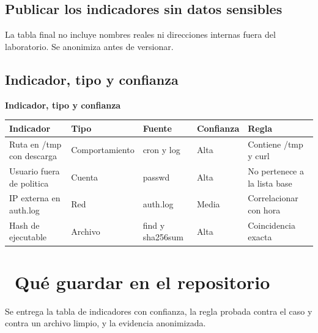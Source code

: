 \documentclass[11pt,a4paper]{article}
\newcommand{\iconotexto}[2]{\textcolor{cyanNeon}{\faIcon{#1}}~#2}
\begin{document}
\subsection{Publicar los indicadores sin datos sensibles}

La tabla final no incluye nombres reales ni direcciones internas fuera del laboratorio. Se anonimiza antes de versionar.

\subsection{Indicador, tipo y confianza}

\begin{center}
\begin{minipage}{\linewidth}
\centering
{\footnotesize
\textbf{Indicador, tipo y confianza}\par\smallskip
\begin{tabular}{@{}>{\raggedright\arraybackslash}p{3.00cm}>{\raggedright\arraybackslash}p{2.60cm}>{\raggedright\arraybackslash}p{2.40cm}>{\raggedright\arraybackslash}p{2.10cm}>{\raggedright\arraybackslash}p{2.70cm}@{}}
\toprule
\textbf{Indicador} & \textbf{Tipo} & \textbf{Fuente} & \textbf{Confianza} & \textbf{Regla} \\
\midrule
Ruta en /tmp con descarga & Comportamiento & cron y log & Alta & Contiene /tmp y curl \\
Usuario fuera de politica & Cuenta & passwd & Alta & No pertenece a la lista base \\
IP externa en auth.log & Red & auth.log & Media & Correlacionar con hora \\
Hash de ejecutable & Archivo & find y sha256sum & Alta & Coincidencia exacta \\
\bottomrule
\end{tabular}
}
\par{}
\end{minipage}
\end{center}

\section{\iconotexto{box-open}{Qué guardar en el repositorio}}

Se entrega la tabla de indicadores con confianza, la regla probada contra el caso y contra un archivo limpio, y la evidencia anonimizada.
\end{document}
